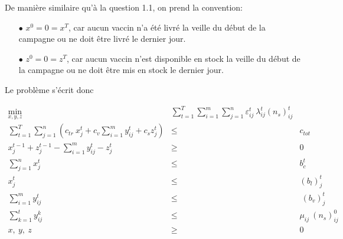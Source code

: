 \documentclass[a4paper,11pt]{report}
\begin{document}
De manière similaire qu'à la question 1.1, on prend la convention:
\begin{itemize}
\item[$\bullet$] $x^0 = 0 = x^T$, car aucun vaccin n'a été livré la veille du début de la campagne ou ne doit être livré le dernier jour.
\item[$\bullet$] $z^0 = 0 = z^T$, car aucun vaccin n'est disponible en stock la veille du début de la campagne ou ne doit être mis en stock le dernier jour.
\end{itemize}
Le problème s'écrit donc

\begin{eqnarray*}
\min_{x, y, z}& \sum_{t=1}^{T} \sum_{i=1}^{m} \sum_{j=1}^{n} \varepsilon_{ij}^t\ \lambda_{ij}^t (n_s)_{ij}^t & \\
\sum_{t=1}^T \sum_{j=1}^{n} \left(c_{tr}\ x_j^t + c_v \sum_{i=1}^{m} y_{ij}^t + c_s z_j^t\right) &\leq& c_{tot} \\
x_j^{t-1} + z_j^{t-1} - \sum_{i=1}^{m} y_{ij}^t - z_j^{t} &\geq& 0 \\
\sum_{j=1}^n x_j^{t} &\leq & b_c^t \\ 
x_j^t &\leq& (b_l)_j^t \\
\sum_{i=1}^{m} y_{ij}^t &\leq&\ (b_v)_j^t \\
\sum_{k=1}^t y_{ij}^k &\leq& \mu_{ij}\ (n_s)_{ij}^0 \\
x,\ y,\ z &\geq& 0
\end{eqnarray*}


%
\end{document}
